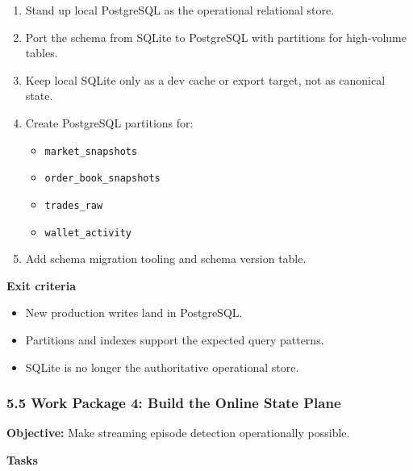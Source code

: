 \documentclass[
]{article}
\providecommand{\tightlist}{%
  \setlength{\itemsep}{0pt}\setlength{\parskip}{0pt}}
\begin{document}
\begin{enumerate}
\def\labelenumi{\arabic{enumi}.}
\tightlist
\item
  Stand up local PostgreSQL as the operational relational store.
\item
  Port the schema from SQLite to PostgreSQL with partitions for
  high-volume tables.
\item
  Keep local SQLite only as a dev cache or export target, not as
  canonical state.
\item
  Create PostgreSQL partitions for:

  \begin{itemize}
  \tightlist
  \item
    \texttt{market\_snapshots}
  \item
    \texttt{order\_book\_snapshots}
  \item
    \texttt{trades\_raw}
  \item
    \texttt{wallet\_activity}
  \end{itemize}
\item
  Add schema migration tooling and schema version table.
\end{enumerate}

\textbf{Exit criteria}

\begin{itemize}
\tightlist
\item
  New production writes land in PostgreSQL.
\item
  Partitions and indexes support the expected query patterns.
\item
  SQLite is no longer the authoritative operational store.
\end{itemize}

\subsubsection{5.5 Work Package 4: Build the Online State
Plane}\label{55-work-package-4-build-the-online-state-plane}

\textbf{Objective:} Make streaming episode detection operationally
possible.

\textbf{Tasks}
\end{document}
